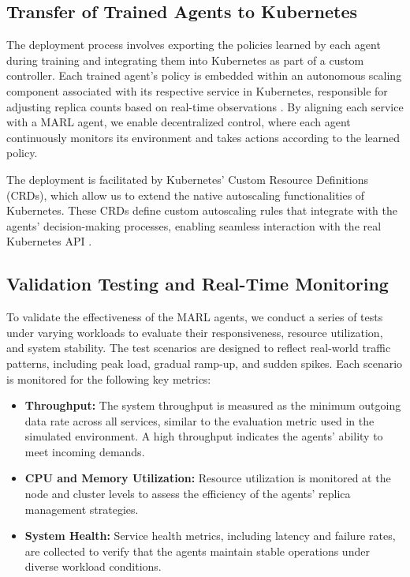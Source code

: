 \documentclass[conference]{IEEEtran}
\begin{document}
\subsection{Transfer of Trained Agents to Kubernetes}

The deployment process involves exporting the policies learned by each agent during training and integrating them into Kubernetes as part of a custom controller. Each trained agent’s policy is embedded within an autonomous scaling component associated with its respective service in Kubernetes, responsible for adjusting replica counts based on real-time observations \cite{nguyen_sim2reality}. By aligning each service with a MARL agent, we enable decentralized control, where each agent continuously monitors its environment and takes actions according to the learned policy.

The deployment is facilitated by Kubernetes' Custom Resource Definitions (CRDs), which allow us to extend the native autoscaling functionalities of Kubernetes. These CRDs define custom autoscaling rules that integrate with the agents' decision-making processes, enabling seamless interaction with the real Kubernetes API \cite{rosenberg_k8s_autoscaling}.

\subsection{Validation Testing and Real-Time Monitoring}

To validate the effectiveness of the MARL agents, we conduct a series of tests under varying workloads to evaluate their responsiveness, resource utilization, and system stability. The test scenarios are designed to reflect real-world traffic patterns, including peak load, gradual ramp-up, and sudden spikes. Each scenario is monitored for the following key metrics:
\begin{itemize}
    \item \textbf{Throughput:} The system throughput is measured as the minimum outgoing data rate across all services, similar to the evaluation metric used in the simulated environment. A high throughput indicates the agents' ability to meet incoming demands.
    \item \textbf{CPU and Memory Utilization:} Resource utilization is monitored at the node and cluster levels to assess the efficiency of the agents' replica management strategies.
    \item \textbf{System Health:} Service health metrics, including latency and failure rates, are collected to verify that the agents maintain stable operations under diverse workload conditions.
\end{itemize}
\end{document}
